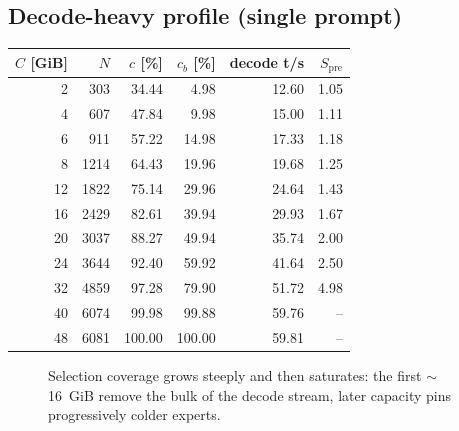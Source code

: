 \documentclass[11pt]{article}
\begin{document}
\subsection*{Decode-heavy profile (single prompt)}

\begin{center}
\begin{tabular}{rrrrrr}
\toprule
$C$ [GiB] & $N$ & $c$ [\%] & $c_b$ [\%] & decode t/s & $S_{\text{pre}}$ \\
\midrule
 2 &  303 & 34.44 &  4.98 & 12.60 & 1.05 \\
 4 &  607 & 47.84 &  9.98 & 15.00 & 1.11 \\
 6 &  911 & 57.22 & 14.98 & 17.33 & 1.18 \\
 8 & 1214 & 64.43 & 19.96 & 19.68 & 1.25 \\
12 & 1822 & 75.14 & 29.96 & 24.64 & 1.43 \\
16 & 2429 & 82.61 & 39.94 & 29.93 & 1.67 \\
20 & 3037 & 88.27 & 49.94 & 35.74 & 2.00 \\
24 & 3644 & 92.40 & 59.92 & 41.64 & 2.50 \\
32 & 4859 & 97.28 & 79.90 & 51.72 & 4.98 \\
40 & 6074 & 99.98 & 99.88 & 59.76 & -- \\
48 & 6081 & 100.00 & 100.00 & 59.81 & -- \\
\bottomrule
\end{tabular}
\end{center}

\begin{figure}[t]
\centering
{}
\caption{Selection coverage grows steeply and then saturates: the first
$\sim$16~GiB remove the bulk of the decode stream, later capacity pins
progressively colder experts.}
\end{figure}
\end{document}
